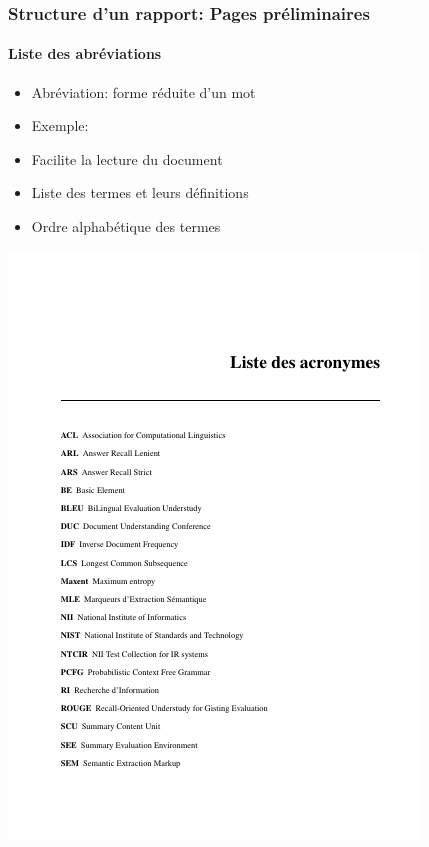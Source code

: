 \documentclass[xcolor=table]{beamer}
\begin{document}
\begin{frame}
\frametitle{Structure d'un rapport: Pages préliminaires}
\framesubtitle{Liste des abréviations}

\begin{minipage}{0.60\textwidth}
	\begin{itemize}
		\item Abréviation: forme réduite d'un mot
		\item Exemple: 
		\item Facilite la lecture du document 
		\item Liste des termes et leurs définitions
		\item Ordre alphabétique des termes
	\end{itemize}
\end{minipage}
\begin{minipage}{0.38\textwidth}
	\includegraphics[width=\textwidth,frame]{..//img/Bweb03-redaction/abbrv-lst.png}
\end{minipage}

\end{frame}
\end{document}
